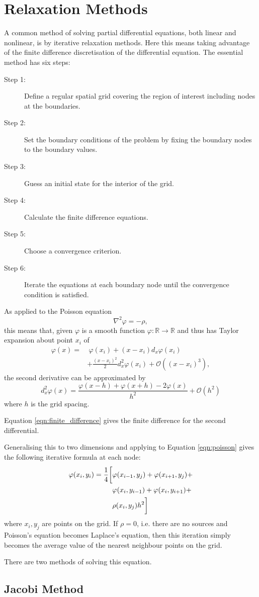 \section{Relaxation Methods}
\label{sec:relaxation_methods}

A common method of solving partial differential equations, both linear and nonlinear, is by iterative relaxation methods. Here this means taking advantage of the finite difference discretisation of the differential equation. The essential method has six steps:
\begin{description}
    \item[Step 1:] Define a regular spatial grid covering the region of interest including nodes at the boundaries.
    \item[Step 2:] Set the boundary conditions of the problem by fixing the boundary nodes to the boundary values.
    \item[Step 3:] Guess an initial state for the interior of the grid.
    \item[Step 4:] Calculate the finite difference equations.
    \item[Step 5:] Choose a convergence criterion.
    \item[Step 6:] Iterate the equations at each boundary node until the convergence condition is satisfied.
\end{description}

As applied to the Poisson equation
\begin{equation}
    \nabla^2 \varphi = -\rho,
    \label{eqn:poisson}
\end{equation}
this means that, given $\varphi$ is a smooth function $\varphi: \mathbb{R} \rightarrow \mathbb{R}$ and thus has Taylor expansion about point $x_i$ of
\begin{align*}
    \varphi(x) =&~\varphi(x_i) + (x-x_i)d_x\varphi(x_i) \\
                & + \frac{(x-x_i)^2}{2}d_x^2\varphi(x_i) + \mathcal{O}((x-x_i)^3),
\end{align*}
the second derivative can be approximated by
\begin{equation}
    d_x^2\varphi(x) = \frac{\varphi(x-h)+\varphi(x+h)-2\varphi(x)}{h^2} + \mathcal{O}(h^2)
    \label{eqn:finite_difference}
\end{equation}
where $h$ is the grid spacing.

Equation \ref{eqn:finite_difference} gives the finite difference for the second differential.

Generalising this to two dimensions and applying to Equation \ref{eqn:poisson} gives the following iterative formula at each node:
\begin{align}
    \varphi(x_i,y_i) = \frac{1}{4}\bigg[&\varphi(x_{i-1},y_j)+\varphi(x_{i+1},y_j)+ \notag \\
        & \varphi(x_i,y_{i-1})+\varphi(x_i,y_{i+1})+ \\
        & \rho(x_i,y_j)h^2\bigg] \notag
    \label{eqn:iteration}
\end{align}
where $x_i,y_j$ are points on the grid. If $\rho = 0$, i.e. there are no sources and Poisson's equation becomes Laplace's equation, then this iteration simply becomes the average value of the nearest neighbour points on the grid.

There are two methods of solving this equation.

\subsection{Jacobi Method}

